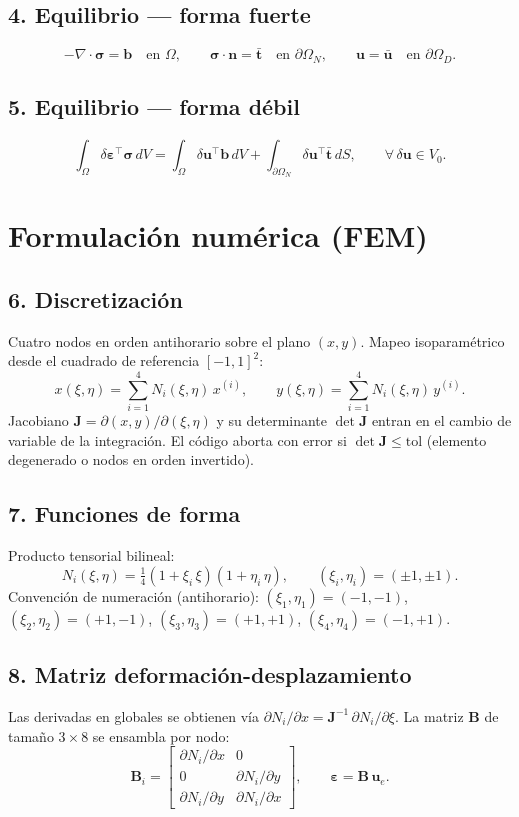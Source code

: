 \documentclass[11pt,letterpaper,oneside]{report}
\begin{document}
\subsection{4. Equilibrio --- forma fuerte}
\[
-\nabla \cdot \boldsymbol{\sigma} = \mathbf{b} \quad \text{en } \Omega, \qquad \boldsymbol{\sigma} \cdot \mathbf{n} = \bar{\mathbf{t}} \quad \text{en } \partial\Omega_N, \qquad \mathbf{u} = \bar{\mathbf{u}} \quad \text{en } \partial\Omega_D.
\]

\subsection{5. Equilibrio --- forma débil}
\[
\int_\Omega \delta \boldsymbol{\varepsilon}^\top \boldsymbol{\sigma}\, dV = \int_\Omega \delta \mathbf{u}^\top \mathbf{b}\, dV + \int_{\partial\Omega_N} \delta \mathbf{u}^\top \bar{\mathbf{t}}\, dS, \qquad \forall\, \delta \mathbf{u} \in V_0.
\]


\section{Formulación numérica (FEM)}

\subsection{6. Discretización}
Cuatro nodos en orden antihorario sobre el plano $(x, y)$. Mapeo isoparamétrico desde el cuadrado de referencia $[-1, 1]^2$:
\[
x(\xi, \eta) = \sum_{i=1}^{4} N_i(\xi, \eta)\, x^{(i)}, \qquad y(\xi, \eta) = \sum_{i=1}^{4} N_i(\xi, \eta)\, y^{(i)}.
\]
Jacobiano $\mathbf{J} = \partial(x, y) / \partial(\xi, \eta)$ y su determinante $\det \mathbf{J}$ entran en el cambio de variable de la integración. El código aborta con error si $\det \mathbf{J} \le \text{tol}$ (elemento degenerado o nodos en orden invertido).

\subsection{7. Funciones de forma}
Producto tensorial bilineal:
\[
N_i(\xi, \eta) = \tfrac{1}{4}(1 + \xi_i\,\xi)(1 + \eta_i\,\eta), \qquad (\xi_i, \eta_i) = (\pm 1, \pm 1).
\]
Convención de numeración (antihorario): $(\xi_1, \eta_1) = (-1, -1)$, $(\xi_2, \eta_2) = (+1, -1)$, $(\xi_3, \eta_3) = (+1, +1)$, $(\xi_4, \eta_4) = (-1, +1)$.

\subsection{8. Matriz deformación-desplazamiento}
Las derivadas en globales se obtienen vía $\partial N_i / \partial x = \mathbf{J}^{-1}\, \partial N_i / \partial \xi$. La matriz $\mathbf{B}$ de tamaño $3 \times 8$ se ensambla por nodo:
\[
\mathbf{B}_i = \begin{bmatrix} \partial N_i / \partial x & 0 \\ 0 & \partial N_i / \partial y \\ \partial N_i / \partial y & \partial N_i / \partial x \end{bmatrix}, \qquad \boldsymbol{\varepsilon} = \mathbf{B}\, \mathbf{u}_e.
\]
\end{document}
